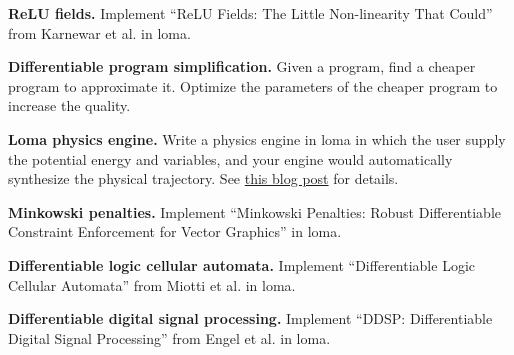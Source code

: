 \textbf{ReLU fields.} Implement ``ReLU Fields: The Little Non-linearity That Could'' from Karnewar et al. in loma.

\textbf{Differentiable program simplification.} Given a program, find a cheaper program to approximate it. Optimize the parameters of the cheaper program to increase the quality.

\textbf{Loma physics engine.} Write a physics engine in loma in which the user supply the potential energy and variables, and your engine would automatically synthesize the physical trajectory. See \href{https://blog.jle.im/entry/hamiltonian-dynamics-in-haskell.html}{this blog post} for details.

\textbf{Minkowski penalties.} Implement ``Minkowski Penalties: Robust Differentiable Constraint Enforcement for Vector Graphics'' in loma.

\textbf{Differentiable logic cellular automata.} Implement ``Differentiable Logic Cellular Automata'' from Miotti et al. in loma.

\textbf{Differentiable digital signal processing.} Implement ``DDSP: Differentiable Digital Signal Processing'' from Engel et al. in loma.


